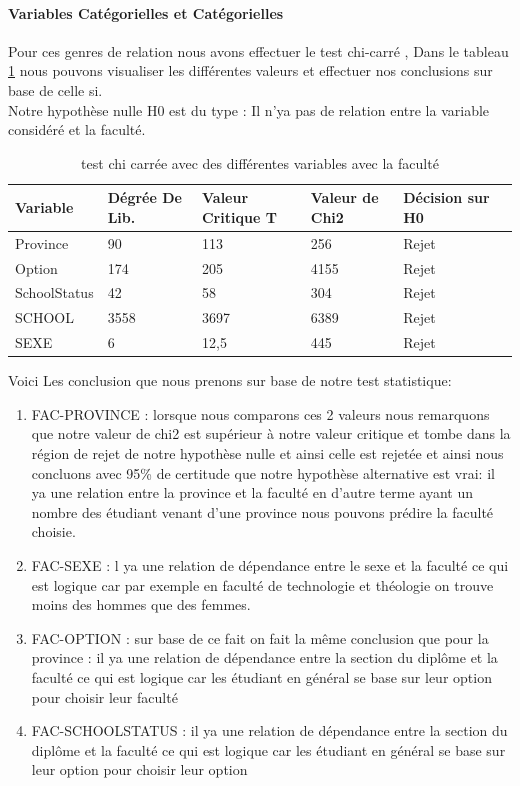  \paragraph{Variables Catégorielles et Catégorielles}
 Pour ces genres de relation nous avons effectuer le test chi-carré , Dans le tableau \ref{tab:chi-Carrée} nous pouvons visualiser les  différentes valeurs et effectuer nos conclusions sur base de celle si.\\
 Notre hypothèse nulle H0 est du type : Il n'ya pas de relation entre la variable considéré et la faculté. 
 \begin{table}
 	\centering
 	\begingroup %
 	\captionsetup{type=table} %
 	\caption{test chi carrée avec des différentes variables avec la faculté }
 	\label{tab:chi-Carrée}
 	\begin{tabular}{lllllr}
 		\toprule
 		 Variable &   Dégrée De Lib.  &         Valeur Critique T & Valeur de Chi2 &  Décision sur H0 \\
 		\midrule
        Province & 90&113&256&Rejet\\
        Option & 174 & 205& 4155& Rejet \\
        SchoolStatus &42&58&304&Rejet\\
        SCHOOL&3558&3697&6389&Rejet\\
        SEXE&6&12,5&445&Rejet\\
 		\bottomrule
 	\end{tabular}
 	\endgroup
 \end{table}
 Voici Les conclusion que nous prenons sur base de notre test statistique:
 \begin{enumerate}
 	\item FAC-PROVINCE :
 	lorsque nous comparons ces 2 valeurs nous remarquons que notre valeur de chi2 est supérieur à notre valeur critique et tombe dans la région de rejet de notre hypothèse nulle et ainsi celle est rejetée et ainsi nous concluons avec 95\% de certitude que notre hypothèse alternative est vrai: il ya une relation entre la province et la faculté en d'autre terme ayant un nombre des étudiant venant d'une province nous pouvons prédire la faculté choisie.
 	\item FAC-SEXE :
 	l ya une relation de dépendance entre le sexe et la faculté ce qui est logique car par exemple en faculté de technologie et théologie on trouve moins des hommes que des femmes.
 	\item FAC-OPTION :
 	sur base de ce fait on fait la même conclusion que pour la province : il ya une relation de dépendance entre la section du diplôme et la faculté ce qui est logique car les étudiant en général se base sur leur option pour choisir leur faculté
 	\item FAC-SCHOOLSTATUS :
 	il ya une relation de dépendance entre la section du diplôme et la faculté ce qui est logique car les étudiant en général se base sur leur option pour choisir leur option
 \end{enumerate}
